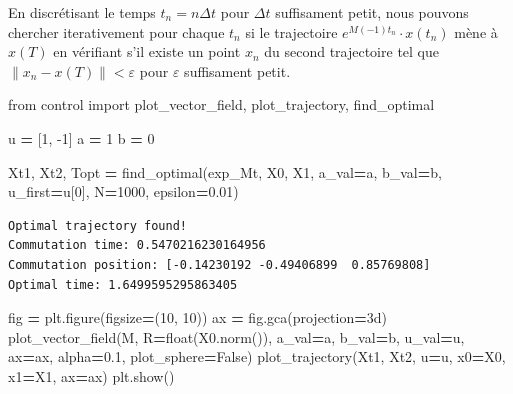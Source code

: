 \documentclass[
  french,
]{article}
\newenvironment{Shaded}{\begin{snugshade}}{\end{snugshade}}
\newcommand{\BuiltInTok}[1]{#1}
\newcommand{\DecValTok}[1]{\textcolor[rgb]{0.00,0.00,0.81}{#1}}
\newcommand{\FloatTok}[1]{\textcolor[rgb]{0.00,0.00,0.81}{#1}}
\newcommand{\ImportTok}[1]{#1}
\newcommand{\NormalTok}[1]{#1}
\newcommand{\OperatorTok}[1]{\textcolor[rgb]{0.81,0.36,0.00}{\textbf{#1}}}
\newcommand{\StringTok}[1]{\textcolor[rgb]{0.31,0.60,0.02}{#1}}
\newcommand{\VariableTok}[1]{\textcolor[rgb]{0.00,0.00,0.00}{#1}}
\begin{document}
En discrétisant le temps \(t_n=n\Delta t\) pour \(\Delta t\)
suffisament petit, nous pouvons chercher iterativement pour
chaque \(t_n\) si le trajectoire \(e^{M(-1)t_n}\cdot x(t_n)\)
mène à \(x(T)\) en vérifiant s'il existe un point \(x_n\)
du second trajectoire tel que \(\left\lVert x_n-x(T)\right\rVert<\varepsilon\)
pour \(\varepsilon\) suffisament petit.

\begin{Shaded}
\begin{Highlighting}[]
\ImportTok{from}\NormalTok{ control }\ImportTok{import}\NormalTok{ plot\_vector\_field, plot\_trajectory, find\_optimal}

\NormalTok{u }\OperatorTok{=}\NormalTok{ [}\DecValTok{1}\NormalTok{, }\DecValTok{{-}1}\NormalTok{]}
\NormalTok{a }\OperatorTok{=} \DecValTok{1}
\NormalTok{b }\OperatorTok{=} \DecValTok{0}

\NormalTok{Xt1, Xt2, Topt }\OperatorTok{=}\NormalTok{ find\_optimal(exp\_Mt, X0, X1, a\_val}\OperatorTok{=}\NormalTok{a, b\_val}\OperatorTok{=}\NormalTok{b, u\_first}\OperatorTok{=}\NormalTok{u[}\DecValTok{0}\NormalTok{], N}\OperatorTok{=}\DecValTok{1000}\NormalTok{, epsilon}\OperatorTok{=}\FloatTok{0.01}\NormalTok{)}
\end{Highlighting}
\end{Shaded}

\begin{verbatim}
Optimal trajectory found!
Commutation time: 0.5470216230164956
Commutation position: [-0.14230192 -0.49406899  0.85769808]
Optimal time: 1.6499595295863405
\end{verbatim}

\begin{Shaded}
\begin{Highlighting}[]
\NormalTok{fig }\OperatorTok{=}\NormalTok{ plt.figure(figsize}\OperatorTok{=}\NormalTok{(}\DecValTok{10}\NormalTok{, }\DecValTok{10}\NormalTok{))}
\NormalTok{ax }\OperatorTok{=}\NormalTok{ fig.gca(projection}\OperatorTok{=}\StringTok{\textquotesingle{}3d\textquotesingle{}}\NormalTok{)}
\NormalTok{plot\_vector\_field(M, R}\OperatorTok{=}\BuiltInTok{float}\NormalTok{(X0.norm()), a\_val}\OperatorTok{=}\NormalTok{a, b\_val}\OperatorTok{=}\NormalTok{b, u\_val}\OperatorTok{=}\NormalTok{u, ax}\OperatorTok{=}\NormalTok{ax, alpha}\OperatorTok{=}\FloatTok{0.1}\NormalTok{, plot\_sphere}\OperatorTok{=}\VariableTok{False}\NormalTok{)}
\NormalTok{plot\_trajectory(Xt1, Xt2, u}\OperatorTok{=}\NormalTok{u, x0}\OperatorTok{=}\NormalTok{X0, x1}\OperatorTok{=}\NormalTok{X1, ax}\OperatorTok{=}\NormalTok{ax)}
\NormalTok{plt.show()}
\end{Highlighting}
\end{Shaded}
\end{document}
